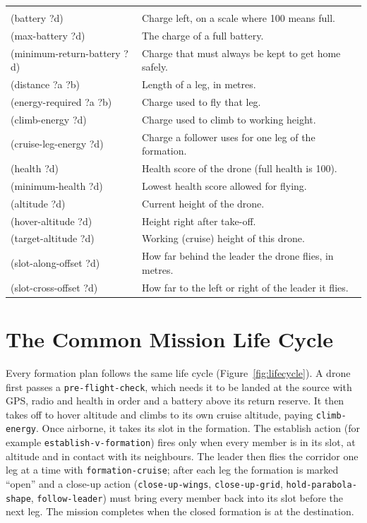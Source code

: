 \documentclass[11pt,a4paper,oneside]{report}
\newcommand{\code}[1]{\texttt{#1}}
\begin{document}
\begin{longtable}{@{}>{\ttfamily\footnotesize}P{0.36\textwidth}P{0.58\textwidth}@{}}
\midrule
{} \\
(battery ?d)            & Charge left, on a scale where 100 means full. \\
(max-battery ?d)        & The charge of a full battery. \\
(minimum-return-battery ?d) & Charge that must always be kept to get home safely. \\
(distance ?a ?b)        & Length of a leg, in metres. \\
(energy-required ?a ?b) & Charge used to fly that leg. \\
(climb-energy ?d)       & Charge used to climb to working height. \\
(cruise-leg-energy ?d)  & Charge a follower uses for one leg of the formation. \\
(health ?d)             & Health score of the drone (full health is 100). \\
(minimum-health ?d)     & Lowest health score allowed for flying. \\
(altitude ?d)           & Current height of the drone. \\
(hover-altitude ?d)     & Height right after take-off. \\
(target-altitude ?d)    & Working (cruise) height of this drone. \\
(slot-along-offset ?d)  & How far behind the leader the drone flies, in metres. \\
(slot-cross-offset ?d)  & How far to the left or right of the leader it flies. \\
\end{longtable}

\section{The Common Mission Life Cycle}
Every formation plan follows the same life cycle (Figure~\ref{fig:lifecycle}). A drone first
passes a \code{pre-flight-check}, which needs it to be landed at the source with GPS, radio and
health in order and a battery above its return reserve. It then takes off to hover altitude and
climbs to its own cruise altitude, paying \code{climb-energy}. Once airborne, it takes its slot
in the formation. The establish action (for example \code{establish-v-formation}) fires only
when every member is in
its slot, at altitude and in contact with its neighbours. The leader then flies the corridor one
leg at a time with \code{formation-cruise}; after each leg the formation is marked ``open'' and
a close-up action (\code{close-up-wings}, \code{close-up-grid}, \code{hold-parabola-shape},
\code{follow-leader}) must bring every member back into its slot before the next leg. The
mission completes when the closed formation is at the destination.
\end{document}
